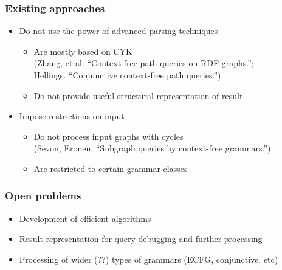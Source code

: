 \documentclass[xcolor=table]{beamer}
\begin{document}
\begin{frame}
  \transwipe[direction=90]
  \frametitle{Existing approaches}
  \begin{itemize}
    \item Do not use the power of advanced parsing techniques
    \begin{itemize}
       \item Are mostly based on CYK \\ (Zhang, et al. ``Context-free path queries on RDF graphs.''; \\ Hellings. ``Conjunctive context-free path queries.'')
       \item Do not provide useful structural representation of result
     \end{itemize}
    \item Impose restrictions on input
    \begin{itemize}
       \item Do not process input graphs with cycles \\ (Sevon, Eronen. ``Subgraph queries by context-free grammars.'')
       \item Are restricted to certain grammar classes
     \end{itemize}
  \end{itemize}
\end{frame}

\begin{frame}
  \transwipe[direction=90]
  \frametitle{Open problems}
  \begin{itemize}
    \item Development of efficient algorithms
    \item Result representation for query debugging and further processing 
    \item Processing of wider (??) types of grammars (ECFG, conjunctive, etc)
  \end{itemize}
\end{frame}

\end{document}
